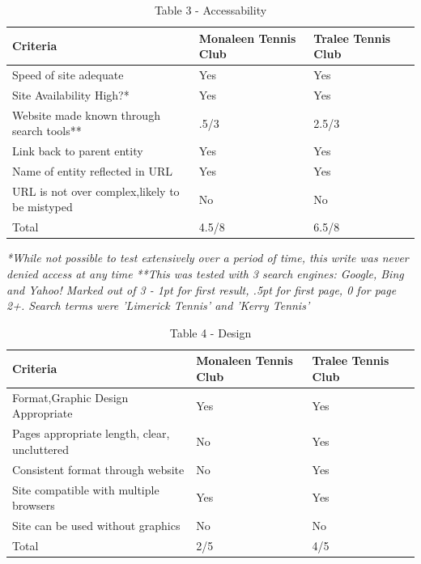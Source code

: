 \begin{table}[H]
\caption{Table 3 - Accessability}
\begin{center}
    \begin{tabular}{ | l | l | l | p{5cm} |}
    \hline
	\textbf{Criteria} & \textbf{Monaleen Tennis Club} & \textbf{Tralee Tennis Club}\\ \hline
	Speed of site adequate& Yes & Yes\\ \hline
	Site Availability High?* & Yes & Yes\\ \hline
	Website made known through search tools** & .5/3 & 2.5/3\\ \hline
	Link back to parent entity & Yes & Yes\\ \hline	
	Name of entity reflected in URL & Yes & Yes\\ \hline	
	URL is not over complex,likely to be mistyped & No& No\\
	\hline	
	Total & 4.5/8 & 6.5/8\\ \hline	
    \end{tabular}
\end{center}
\label{fig:table3}
\end{table}
\textit{*While not possible to test extensively over a period of time, this write was never denied access at any time}\newline
\textit{**This was tested with 3 search engines: Google, Bing and Yahoo! Marked out of 3 - 1pt for first result, .5pt for first page, 0 for page 2+. Search terms were 'Limerick Tennis' and 'Kerry Tennis'}

\begin{table}[H]
\caption{Table 4 - Design}
\begin{center}
    \begin{tabular}{ | l | l | l | p{5cm} |}
    \hline
	\textbf{Criteria} & \textbf{Monaleen Tennis Club} & \textbf{Tralee Tennis Club}\\ \hline
	Format,Graphic Design Appropriate & Yes & Yes\\ \hline
	Pages appropriate length, clear, uncluttered& No & Yes\\ \hline
	Consistent format through website & No & Yes\\ \hline
	Site compatible with multiple browsers & Yes & Yes\\ \hline
	Site can be used without graphics & No & No\\ \hline
	Total & 2/5 & 4/5\\ \hline	
    \end{tabular}
\end{center}
\label{fig:table4}
\end{table}

